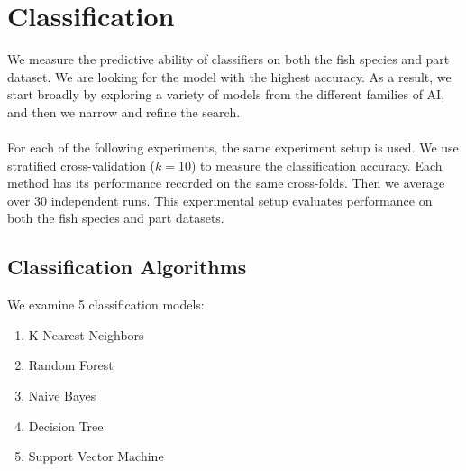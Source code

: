 \documentclass[runningheads]{llncs}
\begin{document}
\section{Classification}

We measure the predictive ability of classifiers on both the fish species and part dataset.
We are looking for the model with the highest accuracy.
As a result, we start broadly by exploring a variety of models from the different families of AI, and then we narrow and refine the search.
\\\\
For each of the following experiments, the same experiment setup is used.
We use stratified cross-validation ($k=10$) to measure the classification accuracy.
Each method has its performance recorded on the same cross-folds.
Then we average over 30 independent runs.
This experimental setup evaluates performance on both the fish species and part datasets.

\subsection{Classification Algorithms}



We examine 5 classification models:

\begin{enumerate}
  \item K-Nearest Neighbors \cite{fix1989discriminatory}
  \item Random Forest \cite{ho1995random}
  \item Naive Bayes \cite{hand2001idiot}
  \item Decision Tree \cite{loh2011classification}
  \item Support Vector Machine \cite{cortes1995support}
\end{enumerate}
\end{document}
